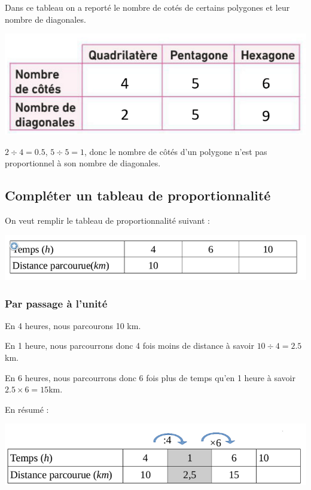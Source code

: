 \documentclass[12pt,a4paper]{article}
\begin{document}
\begin{myex}	
		Dans ce tableau on a reporté le nombre de cotés de certains polygones et leur nombre de diagonales.
		
		\begin{center}
			\includegraphics[scale=0.5]{tab2}
		\end{center}
	
		$2 \div 4 = \num{0.5}$, $5 \div 5 = 1$, donc le nombre de côtés d'un polygone n'est pas proportionnel à son nombre de diagonales.	
	
\end{myex}

\subsection{Compléter un tableau de proportionnalité}

\begin{myex}
	On veut remplir le tableau de proportionnalité suivant :
	
	\begin{center}
		\includegraphics[scale=0.5]{tab3_1}
	\end{center}
\end{myex}


\subsubsection*{Par passage à l'unité}


\begin{mymeth}
	En 4 heures, nous parcourons 10 km.
	
	En 1 heure, nous parcourrons donc 4 fois moins de distance à savoir $10 \div 4 = \num{2.5}$ km.
	
	En 6 heures, nous parcourrons donc 6 fois plus de temps qu’en 1 heure à savoir $\num{2.5} \times 6 = 15 $km.
	
	En résumé :
	
	
	\begin{center}
		\includegraphics[scale=0.5]{tab3_2}
	\end{center}
\end{mymeth}
\end{document}
